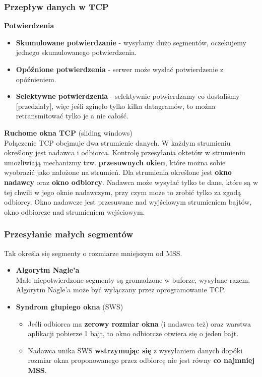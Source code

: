 \documentclass[../main.tex]{subfiles}
\begin{document}
    \subsubsection{Przepływ danych w TCP}
    \textbf{Potwierdzenia}
    \begin{itemize}
        \item \textbf{Skumulowane potwierdzanie} - wysyłamy dużo segmentów, oczekujemy jednego skumulowanego potwierdzenia.
        \item \textbf{Opóźnione potwierdzenia} - serwer może wysłać potwierdzenie z opóźnieniem.
        \item \textbf{Selektywne potwierdzenia} - selektywnie potwierdzamy co dostaliśmy [przedziały], więc jeśli zginęło tylko kilka datagramów, to można retransmitować tylko je a nie całość.
    \end{itemize}

    \textbf{Ruchome okna TCP} (sliding windows)\\
    Połączenie TCP obejmuje dwa strumienie danych. W każdym strumieniu określony jest
    nadawca i odbiorca. Kontrolę przesyłania oktetów w strumieniu umożliwiają mechanizmy
    tzw. \textbf{przesuwnych okien}, które można sobie wyobrazić jako nałożone na
    strumień. Dla strumienia określone jest \textbf{okno nadawcy} oraz \textbf{okno odbiorcy}. Nadawca może
    wysyłać tylko te dane, które są w tej chwili w jego oknie nadawczym, przy czym może to
    zrobić tylko za zgodą odbiorcy. Okno nadawcze jest przesuwane nad wyjściowym
    strumieniem bajtów, okno odbiorcze nad strumieniem wejściowym.\\

    \subsubsection{Przesyłanie małych segmentów}
    Tak określa się segmenty o rozmiarze mniejszym od MSS.
    \begin{itemize}
        \item \textbf{Algorytm Nagle’a}\\
        Małe niepotwierdzone segmenty są gromadzone w buforze, wysyłane razem.
        Algorytm Nagle’a może być wyłączany przez oprogramowanie TCP.
        \item \textbf{Syndrom głupiego okna} (SWS)
        \begin{itemize}
            \item Jeśli odbiorca ma \textbf{zerowy rozmiar okna} (i nadawca też) oraz warstwa aplikacji pobierze 1
            bajt, to okno odbiorcze otwiera się o jeden bajt.
            \item Nadawca unika SWS \textbf{wstrzymując się} z wysyłaniem danych dopóki rozmiar okna proponowanego przez odbiorcę nie jest równy \textbf{co najmniej MSS}.
        \end{itemize}
    \end{itemize}
\end{document}
